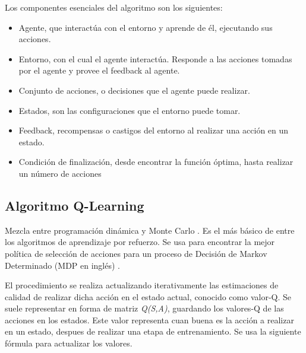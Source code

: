 	\begin{flushleft}
		Los componentes esenciales del algoritmo son los siguientes:
	\end{flushleft}
	\begin{itemize}
		\item Agente, que interactúa con el entorno y aprende de él, ejecutando sus acciones. 
		\item Entorno, con el cual el agente interactúa. Responde a las acciones tomadas por el agente y provee el feedback al agente.
		\item Conjunto de acciones, o decisiones que el agente puede realizar.
		\item Estados, son las configuraciones que el entorno puede tomar.
		\item Feedback, recompensas o castigos del entorno al realizar una acción en un estado.		
		\item Condición de finalización, desde encontrar la función óptima, hasta realizar un número de acciones 
	\end{itemize}


	\subsection{Algoritmo Q-Learning} 
		Mezcla entre programación dinámica y Monte Carlo \cite{wang2012monte}. Es el más básico de entre los algoritmos de aprendizaje por refuerzo. Se usa para encontrar la mejor política de selección de acciones para un proceso de Decisión de Markov Determinado (MDP en inglés) \cite{garcia2013markov}. 
		
		El procedimiento se realiza actualizando iterativamente las estimaciones de calidad de realizar dicha acción en el estado actual, conocido como valor-Q. Se suele representar en forma de matriz \textit{Q(S,A)}, guardando los valores-Q de las acciones en los estados. Este valor representa cuan buena es la acción a realizar en un estado, despues de realizar una etapa de entrenamiento. Se usa la siguiente fórmula para actualizar los valores.
		
